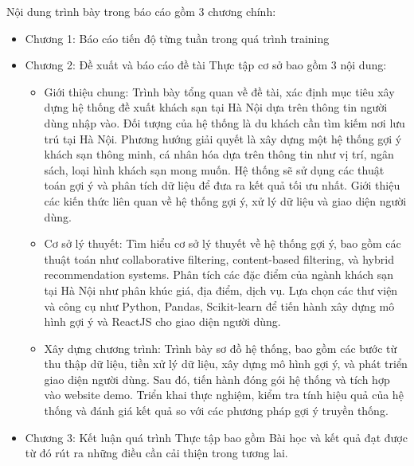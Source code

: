 Nội dung trình bày trong báo cáo gồm 3 chương chính: 
\begin{itemize}
    \item Chương 1: Báo cáo tiến độ từng tuần trong quá trình training 
    \item Chương 2: Đề xuất và báo cáo đề tài Thực tập cơ sở bao gồm 3 nội dung:
    \begin{itemize}
        \item Giới thiệu chung: Trình bày tổng quan về đề tài, xác định mục tiêu xây dựng hệ thống đề xuất khách sạn tại Hà Nội dựa trên thông tin người dùng nhập vào. Đối tượng của hệ thống là du khách cần tìm kiếm nơi lưu trú tại Hà Nội. Phương hướng giải quyết là xây dựng một hệ thống gợi ý khách sạn thông minh, cá nhân hóa dựa trên thông tin như vị trí, ngân sách, loại hình khách sạn mong muốn. Hệ thống sẽ sử dụng các thuật toán gợi ý và phân tích dữ liệu để đưa ra kết quả tối ưu nhất. Giới thiệu các kiến thức liên quan về hệ thống gợi ý, xử lý dữ liệu và giao diện người dùng.
        \item Cơ sở lý thuyết: Tìm hiểu cơ sở lý thuyết về hệ thống gợi ý, bao gồm các thuật toán như collaborative filtering, content-based filtering, và hybrid recommendation systems. Phân tích các đặc điểm của ngành khách sạn tại Hà Nội như phân khúc giá, địa điểm, dịch vụ. Lựa chọn các thư viện và công cụ như Python, Pandas, Scikit-learn để tiến hành xây dựng mô hình gợi ý và ReactJS cho giao diện người dùng. 
    \item Xây dựng chương trình: Trình bày sơ đồ hệ thống, bao gồm các bước từ thu thập dữ liệu, tiền xử lý dữ liệu, xây dựng mô hình gợi ý, và phát triển giao diện người dùng. Sau đó, tiến hành đóng gói hệ thống và tích hợp vào website demo. Triển khai thực nghiệm, kiểm tra tính hiệu quả của hệ thống và đánh giá kết quả so với các phương pháp gợi ý truyền thống.
    \end{itemize}
    \item Chương 3: Kết luận quá trình Thực tập bao gồm Bài học và kết quả đạt được từ đó rút ra những điều cần cải thiện trong tương lai.
\end{itemize}

